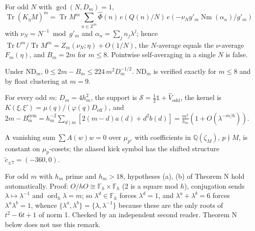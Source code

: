 \begin{theorem}
\label{thm:lineB-trace-formula}
For odd \(N\) with \(\gcd(N,D_m)=1\),
\[\operatorname{Tr}(K_\eta M)^m=\operatorname{Tr}M^m\sum_{n\in\mathbb Z^m}\hat\Phi(n)\,e(Q(n)/N)\,e(-\nu_N y'_m\operatorname{Nm}(\alpha_n)/g'_m)\]
with \(\nu_N=N^{-1}\bmod g'_m\) and \(\alpha_n=\sum_j n_j\lambda^j\); hence
\(\operatorname{Tr}U^m/\operatorname{Tr}M^m=Z_m(\nu_N;\eta)+O(1/N)\), the \(N\)-average equals the \(\nu\)-average \(F_m(\eta)\),
and \(B_m=2m\) for \(m\le 8\). Pointwise self-averaging in a single \(N\) is false.
\end{theorem}

\begin{theorem}
Under ND\(_m\), \(0\le 2m-B_m\le 224\,m^2D_m^{-1/2}\). ND\(_m\) is verified exactly for \(m\le 8\) and by float clustering at \(m=9\).
\end{theorem}

\begin{theorem}
For every odd \(m\): \(D_m=4h_m^2\), the support is \(\mathcal S=\tfrac12\mathbb 1+\widehat V_{\mathrm{odd}}\),
the kernel is \(K(\xi,\xi')=\mu(q)/(\varphi(q)D_{\mathrm{eff}})\), and
\(2m-B^{\mathrm{sym}}_m=h_m^{-2}\sum_{d\mid m}[2(m-d)a(d)+d^2b(d)]=\tfrac{m^2}{h_m}(1+O(\lambda^{-m/6}))\).
\end{theorem}

\begin{lemma}
A vanishing sum \(\sum A(w)w=0\) over \(\mu_{p^e}\) with coefficients in \(\mathbb Q(\zeta_M)\), \(p\nmid M\), is constant on \(\mu_p\)-cosets; the aliased kick symbol has the shifted structure \(\tilde c_{\pm7}=(-360,0)\).
\end{lemma}

\begin{remark}
For odd \(m\) with \(h_m\) prime and \(h_m>18\), hypotheses (a), (b) of Theorem N hold automatically.
Proof: \(O/hO\cong\mathbb F_h\times\mathbb F_h\) (2 is a square mod \(h\)), conjugation sends \(\lambda\mapsto\lambda^{-1}\) and \(\operatorname{ord}_h\lambda=m\); so \(\lambda^d\in\mathbb F_h\) forces \(\lambda^d=1\), and \(\lambda^a+\lambda^b=6\) forces \(\lambda^a\lambda^b=1\), whence \(\{\lambda^a,\lambda^b\}=\{\lambda,\lambda^{-1}\}\) because these are the only roots of \(t^2-6t+1\) of norm 1.
Checked by an independent second reader. Theorem N below does not use this remark.
\end{remark}


